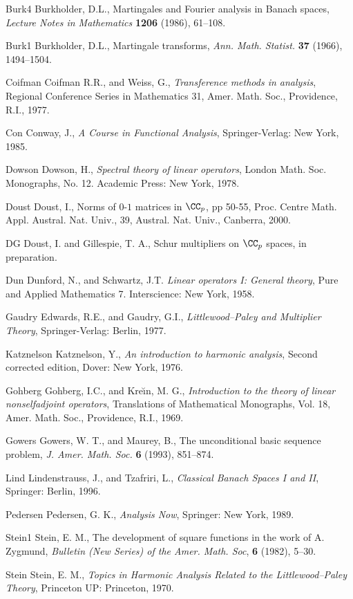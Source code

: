 \begin{thebibliography}{999}
\bibitem
{Burk4} Burkholder, D.L.,
Martingales and Fourier analysis in Banach spaces,
\textit{Lecture Notes in Mathematics} \textbf{1206} (1986), 61--108.

\bibitem
{Burk1} Burkholder, D.L.,
Martingale transforms,
\textit{Ann. Math. Statist.} \textbf{37} (1966), 1494--1504.

\bibitem
{Coifman} Coifman R.R., and Weiss, G.,
\textit{Transference methods in analysis},
Regional Conference Series in Mathematics 31,
Amer. Math. Soc., Providence, R.I., 1977.

\bibitem
{Con} Conway, J.,
\textit{A Course in Functional Analysis},
Springer-Verlag: New York, 1985.

\bibitem
{Dowson} Dowson, H.,
\textit{Spectral theory of linear operators},
London Math. Soc. Monographs, No. 12. Academic Press: New York, 1978.

\bibitem
{Doust}
Doust, I., Norms of $0$-$1$ matrices in $\CC_p$,  pp 50-55, Proc.
Centre Math. Appl. Austral. Nat. Univ., 39, Austral. Nat. Univ.,
Canberra, 2000.

\bibitem
{DG} Doust, I.  and Gillespie, T. A.,
Schur multipliers on $\CC_p$ spaces,
in preparation.

\bibitem
{Dun} Dunford, N., and Schwartz, J.T.
\textit{Linear operators I: General theory},
Pure and Applied Mathematics 7. Interscience: New York, 1958.

\bibitem
{Gaudry} Edwards, R.E., and Gaudry, G.I.,
\textit{Littlewood--Paley and Multiplier Theory},
Springer-Verlag: Berlin, 1977.

\bibitem
{Katznelson}
Katznelson, Y.,
\textit{An introduction to harmonic analysis},
Second corrected edition, Dover: New York, 1976.

\bibitem
{Gohberg}
Gohberg, I.C., and Kre\u{\i}n, M. G.,
\textit{Introduction to the theory of linear nonselfadjoint operators},
Translations of Mathematical Monographs, Vol. 18, Amer. Math. Soc.,
Providence, R.I., 1969.

\bibitem
{Gowers} Gowers, W. T., and Maurey, B.,
The unconditional basic sequence problem,
\textit{J. Amer. Math. Soc.} \textbf{6} (1993), 851--874.

\bibitem
{Lind}
Lindenstrauss, J., and Tzafriri, L.,
\textit{Classical Banach Spaces I and II},
Springer: Berlin, 1996.

\bibitem
{Pedersen}
Pedersen, G. K.,
\textit{Analysis Now},
Springer: New York, 1989.

\bibitem
{Stein1}
Stein, E. M.,
The development of square functions in the work of A. Zygmund,
\textit{Bulletin (New Series) of the Amer. Math. Soc},
\textbf{6} (1982), 5--30.

\bibitem
{Stein}
Stein, E. M.,
\textit{Topics in Harmonic Analysis Related to the Littlewood--Paley Theory},
Princeton UP: Princeton, 1970.
\end{thebibliography}
